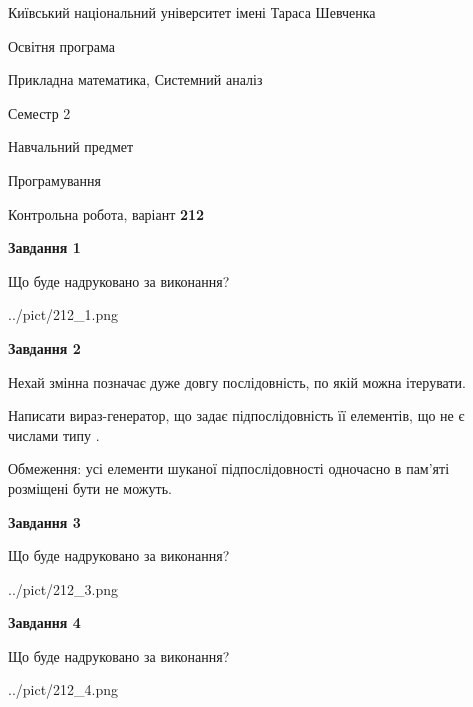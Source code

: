 \documentclass[12pt, ukrainian]{article}
\begin{document}
{{\begin {small}\par
{ \center  Київський національний університет імені Тараса Шевченка \par}
{\parbox {5 cm}{Освітня програма \hfill}{\parbox {8 cm}{Прикладна математика, Системний аналіз \hfill}}\parbox {5 cm}{\hfill Семестр 2}}\par
{\parbox {5 cm} {Навчальний предмет \hfill}\parbox {7 cm}{Програмування \hfill}\parbox {6cm}{\hfill}\par}\vspace{-7pt} \end{small}}{\center Контрольна робота, варіант  \No \textbf
{ 212 }\par}}
{
\begin {large}
{\begin {center}\textbf{Завдання 1}\end {center}}\par
Що буде надруковано за виконання?\par\par
\begin{center}
	{../pict/212_1.png}
\end{center}
\newpage

{\begin {center}\textbf{Завдання 2}\end {center}}\par
Нехай змінна  позначає дуже довгу послідовність, по якій можна ітерувати.

Написати вираз-генератор, що задає підпослідовність її елементів, що не є числами типу .

Обмеження: усі елементи шуканої підпослідовності одночасно в пам'яті розміщені бути не можуть.\par
\newpage

{\begin {center}\textbf{Завдання 3}\end {center}}\par
Що буде надруковано за виконання?
\begin{center}
	{../pict/212_3.png}
\end{center}
\newpage

{\begin {center}\textbf{Завдання 4}\end {center}}\par
Що буде надруковано за виконання?\par
\begin{center}
	{../pict/212_4.png}
\end{center}
\newpage


\end{large}}
\end{document}
